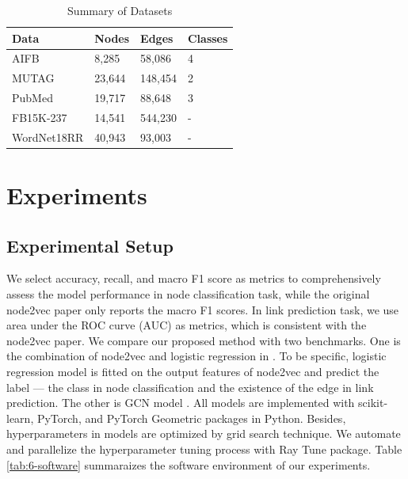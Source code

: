 \documentclass[sigconf]{acmart}
\begin{document}
\begin{table}[!ht]
    \centering
    \caption{Summary of Datasets}
    \label{tab:5-data}
    \begin{tabular}{llll}
        \toprule
        \textbf{Data} & \textbf{Nodes} & \textbf{Edges} & \textbf{Classes} \\
        \midrule
        AIFB & 8,285 & 58,086 & 4\\
        MUTAG & 23,644 & 148,454 & 2\\
        PubMed & 19,717 & 88,648 & 3\\
        FB15K-237 & 14,541 & 544,230 & -\\
        WordNet18RR & 40,943 & 93,003 & -\\
        \bottomrule
    \end{tabular}
\end{table}

\section{Experiments}


\subsection{Experimental Setup}
We select accuracy, recall, and macro F1 score as metrics to comprehensively assess the model performance in node classification task, while the original node2vec paper \cite{node2vec} only reports the macro F1 scores. In link prediction task, we use area under the ROC curve (AUC) as metrics, which is consistent with the node2vec paper. We compare our proposed method with two benchmarks. One is the combination of node2vec and logistic regression in \cite{node2vec}. To be specific, logistic regression model is fitted on the output features of node2vec and predict the label --- the class in node classification and the existence of the edge in link prediction. The other is GCN model \cite{gcn}. All models are implemented with scikit-learn, PyTorch, and PyTorch Geometric packages in Python. Besides, hyperparameters in models are optimized by grid search technique. We automate and parallelize the hyperparameter tuning process with Ray Tune package. Table \ref{tab:6-software} summaraizes the software environment of our experiments.
\end{document}
